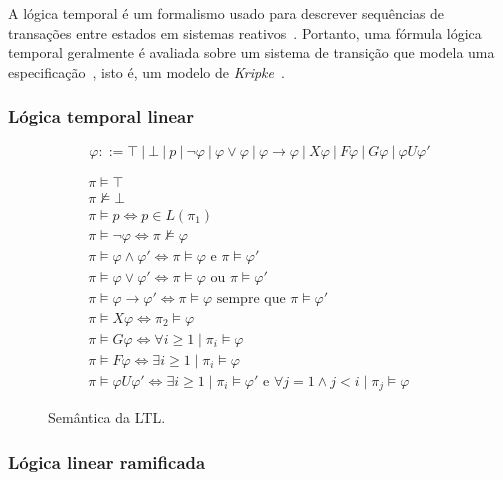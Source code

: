 A lógica temporal é um formalismo usado para descrever sequências de transações entre estados em sistemas reativos~\cite{clarke1999model}. Portanto, uma fórmula lógica temporal geralmente é avaliada sobre um sistema de transição que modela uma especificação~\cite{clarke1999model}, isto é, um modelo de \textit{Kripke}~\cite{kripke1959completeness}. 

\subsubsection{Lógica temporal linear}

\begin{equation}
\varphi ::= \top~|~\bot~|~p~|~\neg \varphi~|~\varphi \vee \varphi~|~\varphi \rightarrow \varphi~|~X\varphi~|~F\varphi~|~G\varphi~|~\varphi U \varphi'
\end{equation}

\begin{figure}[ht]
	\centering
\begin{eqnarray}
\pi \models \top && \\
\pi \nvDash \bot && \\
\pi \models p \Longleftrightarrow p \in L(\pi_{1}) && \\
\pi \models \neg \varphi \iff \pi \not \models \varphi && \\
\pi \models \varphi \wedge \varphi' \iff \pi \models \varphi \mbox{ e } \pi \models \varphi' && \\
\pi \models \varphi \vee \varphi' \iff \pi \models \varphi \mbox{ ou } \pi \models \varphi' && \\
\pi \models \varphi \to \varphi' \iff \pi \models \varphi \mbox{ sempre que } \pi \models \varphi' && \\
\pi \models X\varphi \iff \pi_2 \models \varphi && \\
\pi \models G\varphi \iff \forall i \geq 1 \mid \pi_i \models \varphi && \\
\pi \models F\varphi \iff \exists i \geq 1 \mid \pi_i \models \varphi && \\
\pi \models \varphi U \varphi' \iff \exists i \geq 1 \mid \pi_i \models \varphi' \mbox{ e } \forall j = 1 \wedge j < i \mid \pi_j \models \varphi &&
\end{eqnarray}
	\caption{Semântica da LTL.
		\label{fig:ltl_sem}}
\end{figure}
\FloatBarrier

\subsubsection{Lógica linear ramificada}

